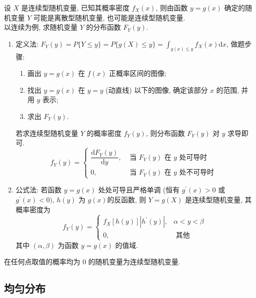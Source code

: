 设 $ X $ 是连续型随机变量, 已知其概率密度 $ f_{X}(x) $, 则由函数 $ y=g(x) $ 确定的随机变量 $ Y $ 可能是离散型随机变量, 也可能是连续型随机变量. \\
以连续为例, 求随机变量 $ Y $ 的分布函数 $ F_{Y}(y) $.
\begin{enumerate}[label=(\arabic{*})]
    \item 定义法: $\displaystyle F_{Y}(y)=P\{Y \leqslant y\}  =P\{g(X) \leqslant y\}  =\int_{g(x) \leqslant y} f_{X}(x) \mathrm{d} x$, 做题步骤:
          \begin{enumerate}
              \item 画出 $ y=g(x) $ 在 $ f(x) $ 正概率区间的图像;
              \item 找出 $ y=g(x) $ 在 $ y=y $ (动直线) 以下的图像, 确定该部分 $ x $ 的范围, 并用 $ y $ 表示;
              \item 求出 $ F_{Y}(y) $.
          \end{enumerate}
          若求连续型随机变量 $ Y $ 的概率密度 $ f_{Y}(y) $, 则分布函数 $ F_{Y}(y) $ 对 $ y $ 求导即可.
          $$
              f_Y(y)=\begin{cases}
                  \dfrac{\mathrm{d} F_{Y}(y)}{\mathrm{d} y}, & \text { 当 } F_{Y}(y) \text { 在 } y \text { 处可导时 }   \\
                  0,                                         & \text { 当 } F_{Y}(y) \text { 在 } y \text { 处不可导时 }
              \end{cases}
          $$
    \item 公式法: 若函数 $ y=g(x) $ 处处可导且严格单调 (恒有 $ g^{\prime}(x)>0 $ 或 $ g^{\prime}(x)<0)$, $ h(y) $ 为 $ g(x) $的反函数, 则 $ Y=g(X) $ 是连续型随机变量,
          其概率密度为
          $$
              f_{Y}(y)=\begin{cases}
                  f_{X}[h(y)]\left|h^{\prime}(y)\right|, & \alpha<y<\beta \\
                  0,                                     & \text { 其他 }
              \end{cases}
          $$
          其中 $ (\alpha, \beta) $ 为函数 $ y=g(x) $ 的值域.
\end{enumerate}

\begin{theorem}
    在任何点取值的概率均为 0 的随机变量为连续型随机变量.
\end{theorem}

\subsection{均匀分布}

